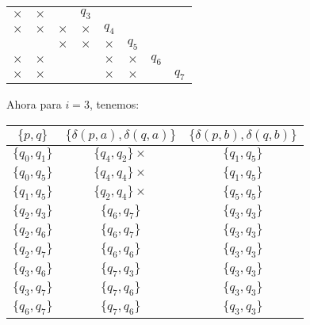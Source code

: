 \begin{itemize}
\begin{center}
\begin{tabular}{cccccccc}
                   \multicolumn{1}{|c|}{$\times$} & \multicolumn{1}{|c|}{$\times$} & \multicolumn{1}{|c|}{} & $q_3$\\ \cline{1-4}
                   \multicolumn{1}{|c|}{$\times$} & \multicolumn{1}{|c|}{$\times$} & \multicolumn{1}{|c|}{$\times$} & \multicolumn{1}{|c|}{$\times$} & $q_4$ \\ \cline{1-5}
                   \multicolumn{1}{|c|}{} & \multicolumn{1}{|c|}{} & \multicolumn{1}{|c|}{$\times$} & \multicolumn{1}{|c|}{$\times$} & \multicolumn{1}{|c|}{$\times$} & $q_5$ \\ \cline{1-6}
                   \multicolumn{1}{|c|}{$\times$} & \multicolumn{1}{|c|}{$\times$} & \multicolumn{1}{|c|}{} & \multicolumn{1}{|c|}{} & \multicolumn{1}{|c|}{$\times$} & \multicolumn{1}{|c|}{$\times$} & $q_6$ \\ \cline{1-7}
                   \multicolumn{1}{|c|}{$\times$} & \multicolumn{1}{|c|}{$\times$} & \multicolumn{1}{|c|}{} & \multicolumn{1}{|c|}{} & \multicolumn{1}{|c|}{$\times$} & \multicolumn{1}{|c|}{$\times$} & \multicolumn{1}{|c|}{} & $q_7$ \\ \cline{1-7}
                \end{tabular}
            \end{center}
            Ahora para $i=3$, tenemos:
            \begin{center}
                \begin{tabular}{c||c|c}
                  $\{p,q\}$ & $\{\delta(p,a),\delta(q,a)\}$ & $\{\delta(p,b),\delta(q,b)\}$\\ \hline
                  $\{q_0,q_1\}$ & $\{q_4,q_2\}\times$ & $\{q_1,q_5\}$ \\ \hline
                  $\{q_0,q_5\}$ & $\{q_4,q_4\}\times$ & $\{q_1,q_5\}$ \\ \hline
                  $\{q_1,q_5\}$ & $\{q_2,q_4\}\times$ & $\{q_5,q_5\}$ \\ \hline
                  $\{q_2,q_3\}$ & $\{q_6,q_7\}$ & $\{q_3,q_3\}$ \\ \hline
                  $\{q_2,q_6\}$ & $\{q_6,q_7\}$ & $\{q_3,q_3\}$ \\ \hline
                  $\{q_2,q_7\}$ & $\{q_6,q_6\}$ & $\{q_3,q_3\}$ \\ \hline
                  $\{q_3,q_6\}$ & $\{q_7,q_3\}$ & $\{q_3,q_3\}$ \\ \hline
                  $\{q_3,q_7\}$ & $\{q_7,q_6\}$ & $\{q_3,q_3\}$ \\ \hline
                  $\{q_6,q_7\}$ & $\{q_7,q_6\}$ & $\{q_3,q_3\}$ \\ \hline

\end{tabular}
\end{center}
\end{itemize}
